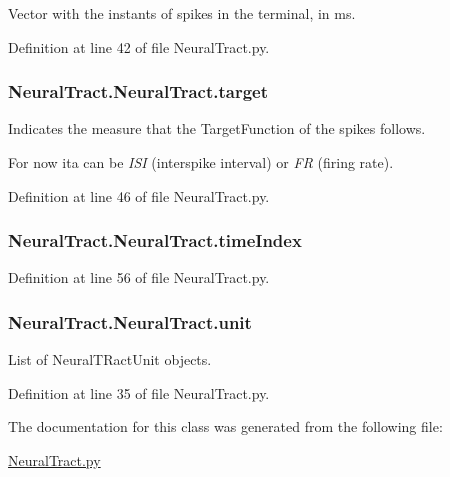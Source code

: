 Vector with the instants of spikes in the terminal, in ms. 



Definition at line 42 of file Neural\+Tract.\+py.

\subsubsection[{\texorpdfstring{target}{target}}]{\setlength{\rightskip}{0pt plus 5cm}Neural\+Tract.\+Neural\+Tract.\+target}\hypertarget{class_neural_tract_1_1_neural_tract_a637995fcac5bdd80ab1a9d4ea3de7f40}{}\label{class_neural_tract_1_1_neural_tract_a637995fcac5bdd80ab1a9d4ea3de7f40}


Indicates the measure that the Target\+Function of the spikes follows. 

For now ita can be {\itshape I\+SI} (interspike interval) or {\itshape FR} (firing rate). 

Definition at line 46 of file Neural\+Tract.\+py.

\subsubsection[{\texorpdfstring{time\+Index}{timeIndex}}]{\setlength{\rightskip}{0pt plus 5cm}Neural\+Tract.\+Neural\+Tract.\+time\+Index}\hypertarget{class_neural_tract_1_1_neural_tract_adcda2b95aa86d4e7eebcc2557aee58cf}{}\label{class_neural_tract_1_1_neural_tract_adcda2b95aa86d4e7eebcc2557aee58cf}


Definition at line 56 of file Neural\+Tract.\+py.

\subsubsection[{\texorpdfstring{unit}{unit}}]{\setlength{\rightskip}{0pt plus 5cm}Neural\+Tract.\+Neural\+Tract.\+unit}\hypertarget{class_neural_tract_1_1_neural_tract_a95db7d0720ec12f091758968476ba240}{}\label{class_neural_tract_1_1_neural_tract_a95db7d0720ec12f091758968476ba240}


List of Neural\+T\+Ract\+Unit objects. 



Definition at line 35 of file Neural\+Tract.\+py.



The documentation for this class was generated from the following file\+:\begin{DoxyCompactItemize}
\item 
\hyperlink{_neural_tract_8py}{Neural\+Tract.\+py}\end{DoxyCompactItemize}
